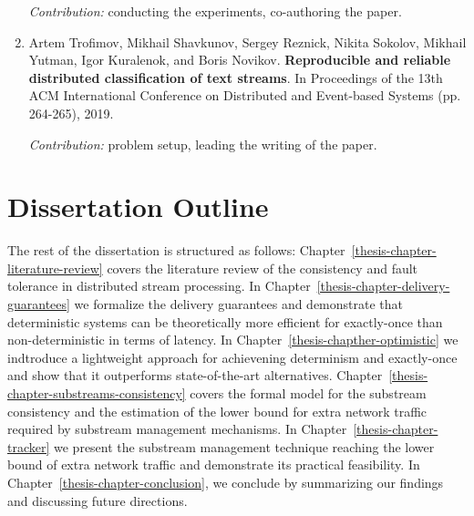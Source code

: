 \begin{enumerate}
    \textit{Contribution:} conducting the experiments, co-authoring the paper.

    \item Artem Trofimov, Mikhail Shavkunov, Sergey Reznick, Nikita Sokolov, Mikhail Yutman, Igor Kuralenok, and Boris Novikov. \textbf{Reproducible and reliable distributed classification of text streams}. In Proceedings of the 13th ACM International Conference on Distributed and Event-based Systems (pp. 264-265), 2019. \newline
    
    \textit{Contribution:} problem setup, leading the writing of the paper.
\end{enumerate}

\section{Dissertation Outline}

The rest of the dissertation is structured as follows: Chapter~\ref{thesis-chapter-literature-review} covers the literature review of the consistency and fault tolerance in distributed stream processing. In Chapter~\ref{thesis-chapter-delivery-guarantees} we formalize the delivery guarantees and demonstrate that deterministic systems can be theoretically more efficient for exactly-once than non-deterministic in terms of latency. In Chapter~\ref{thesis-chapther-optimistic} we indtroduce a lightweight approach for achievening determinism and exactly-once and show that it outperforms state-of-the-art alternatives. Chapter~\ref{thesis-chapter-substreams-consistency} covers the formal model for the substream consistency and the estimation of the lower bound for extra network traffic required by substream management mechanisms. In Chapter~\ref{thesis-chapter-tracker} we present the substream management technique reaching the lower bound of extra network traffic and demonstrate its practical feasibility. In Chapter~\ref{thesis-chapter-conclusion}, we conclude by summarizing our findings and discussing future directions.